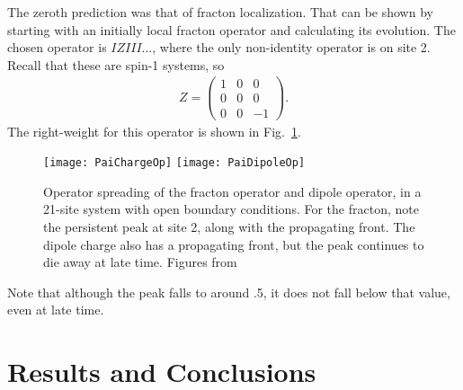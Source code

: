 \documentclass[a4paper,12pt]{article}
\begin{document}
The zeroth prediction was that of fracton localization. That can be shown by starting with an initially local fracton operator and calculating its evolution. The chosen operator is $IZIII\dots$, where the only non-identity operator is on site 2. Recall that these are spin-1 systems, so 
\begin{align}
Z = \begin{pmatrix} 1 & 0 & 0 \\ 0 & 0 & 0 \\ 0 & 0 & -1 \end{pmatrix}.
\end{align}
The right-weight for this operator is shown in Fig.~\ref{fig:PaiChargeOp}.
\begin{figure}
	\centering
	\texttt{[image: PaiChargeOp]}
	\texttt{[image: PaiDipoleOp]}
	\caption{Operator spreading of the fracton operator and dipole operator, in a 21-site system with open boundary conditions. For the fracton, note the persistent peak at site 2, along with the propagating front. The dipole charge also has a propagating front, but the peak continues to die away at late time. Figures from~\cite{PaiFracton}}
	\label{fig:PaiChargeOp}
\end{figure}
Note that although the peak falls to around .5, it does not fall below that value, even at late time.


\section{Results and Conclusions} \label{sec:conc}

\nocite{apsrev41Control}

\end{document}
